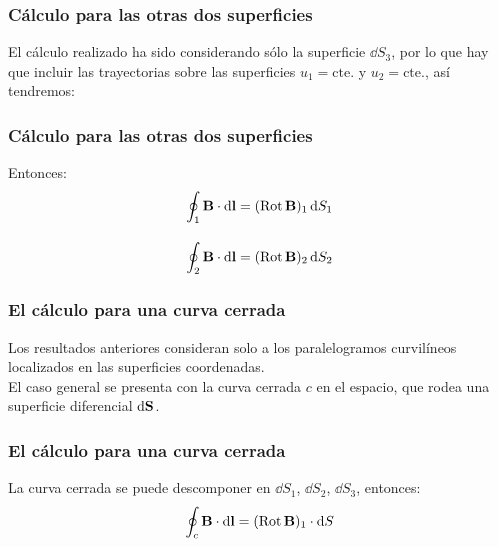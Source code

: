 \documentclass[12pt]{beamer}
\begin{document}
\begin{frame}
\frametitle{Cálculo para las otras dos superficies}
El cálculo realizado ha sido considerando sólo la superficie $\dd{S_{3}}$, por lo que hay que incluir las trayectorias sobre las superficies $u_{1} = \mbox{cte.}$ y $u_{2} = \mbox{cte.}$, así tendremos:
\end{frame}
\begin{frame}
\frametitle{Cálculo para las otras dos superficies}
Entonces:
\begin{align*}
\oint_{1} \vb{B} \cdot \dd{\vb{l}} &= ({\rm{Rot}} \, \vb{B})_{1} \dd{S_{1}} \\[1em]
\oint_{2} \vb{B} \cdot \dd{\vb{l}} &= ({\rm{Rot}} \, \vb{B})_{2} \dd{S_{2}}
\end{align*}
\end{frame}
\begin{frame}
\frametitle{El cálculo para una curva cerrada}
Los resultados anteriores consideran solo a los paralelogramos curvilíneos localizados en las superficies coordenadas.
\\
\bigskip
El caso general se presenta con la curva cerrada $c$ en el espacio, que rodea una superficie diferencial $\dd{\vb{S}}$.
\end{frame}
\begin{frame}
\frametitle{El cálculo para una curva cerrada}
La curva cerrada se puede descomponer en $\dd{S_{1}}$, $\dd{S_{2}}$, $\dd{S_{3}}$, entonces:
\begin{align*}
\oint_{c} \vb{B} \cdot \dd{\vb{l}} = ({\rm{Rot}} \, \vb{B})_{1} \cdot \dd{S} 
\end{align*}
\end{frame}
\end{document}
